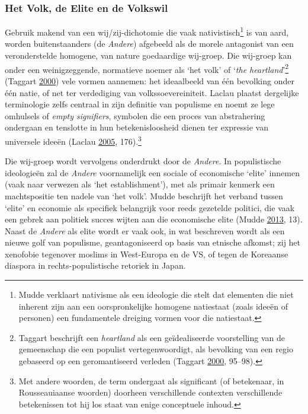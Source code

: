 \documentclass[10.5pt,dutch,]{article}
\begin{document}
\subsubsection{Het Volk, de Elite en de
Volkswil}\label{het-volk-de-elite-en-de-volkswil}

Gebruik makend van een wij/zij-dichotomie die vaak
nativistisch\footnote{Mudde verklaart nativisme als een ideologie die
  stelt dat elementen die niet inherent zijn aan een oorspronkelijke
  homogene natiestaat (zoals ideeën of personen) een fundamentele
  dreiging vormen voor die natiestaat.} is van aard, worden
buitenstaanders (de \emph{Andere}) afgebeeld als de morele antagonist
van een veronderstelde homogene, van nature goedaardige wij-groep. Die
wij-groep kan onder een weinigzeggende, normatieve noemer als `het volk'
of `\emph{the heartland}'\footnote{Taggart beschrijft een
  \emph{heartland} als een geïdealiseerde voorstelling van de
  gemeenschap die een populist vertegenwoordigt, als bevolking van een
  regio gebaseerd op een geromantiseerd verleden (Taggart
  \protect\hyperlink{ref-taggartux5fpopulismux5f2000}{2000}, 95--98).}
(Taggart \protect\hyperlink{ref-taggartux5fpopulismux5f2000}{2000}) vele
vormen aannemen: het ideaalbeeld van één bevolking onder één natie, of
net ter verdediging van volkssoevereiniteit. Laclau plaatst dergelijke
terminologie zelfs centraal in zijn definitie van populisme en noemt ze
lege omhulsels of \emph{empty signifiers}, symbolen die een proces van
abstrahering ondergaan en tenslotte in hun betekenisloosheid dienen ter
expressie van universele ideeën (Laclau
\protect\hyperlink{ref-laclauux5fpopulistux5f2005}{2005},
176).\footnote{Met andere woorden, de term ondergaat als significant (of
  betekenaar, in Rousseauiaanse woorden) doorheen verschillende contexten
  verschillende betekenissen tot hij los staat van enige conceptuele
  inhoud.}

Die wij-groep wordt vervolgens onderdrukt door de \emph{Andere}. In
populistische ideologieën zal de \emph{Andere} voornamelijk een sociale
of economische `elite' innemen (vaak naar verwezen als `het
establishment'), met als primair kenmerk een machtspositie ten nadele
van `het volk'. Mudde beschrijft het verband tussen `elite' en economie
als specifiek belangrijk voor reeds gezetelde politici, die vaak een
gebrek aan politiek succes wijten aan die economische elite (Mudde
\protect\hyperlink{ref-muddeux5foxfordux5f2013}{2013}, 13). Naast de
\emph{Andere} als elite wordt er vaak ook, in wat beschreven wordt als een
nieuwe golf van populisme, geantagoniseerd op basis van etnische
afkomst; zij het xenofobie tegenover moslims in West-Europa en de VS, of
tegen de Koreaanse diaspora in rechts-populistische retoriek in Japan.
\end{document}
